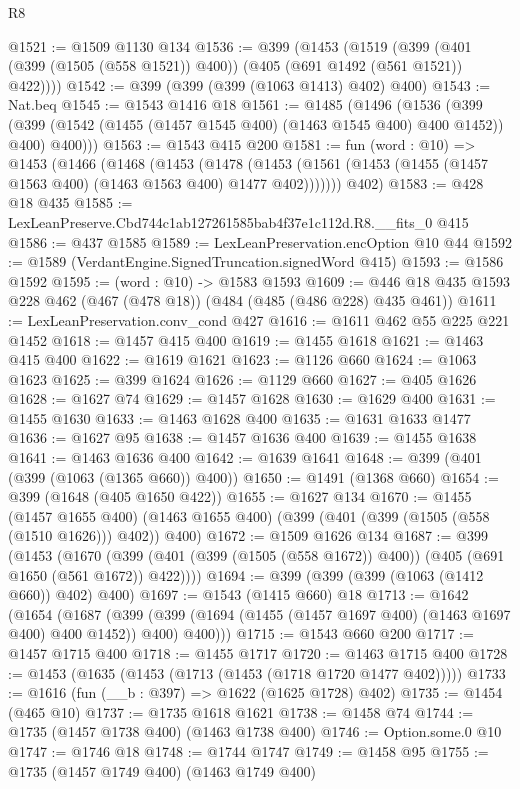 \begin{lexlean}{R8}
\begin{coremodule}
@1521 := @1509 @1130 @134
@1536 := @399
    (@1453
      (@1519 (@399 (@401 (@399 (@1505 (@558 @1521)) @400)) (@405 (@691 @1492 (@561 @1521)) @422))))
@1542 := @399 (@399 (@399 (@1063 @1413) @402) @400)
@1543 := Nat.beq
@1545 := @1543 @1416 @18
@1561 := @1485
    (@1496
      (@1536
        (@399 (@399 (@1542 (@1455 (@1457 @1545 @400) (@1463 @1545 @400) @400 @1452)) @400) @400)))
@1563 := @1543 @415 @200
@1581 := fun (word : @10) =>
  @1453
    (@1466
      (@1468
        (@1453
          (@1478 (@1453 (@1561 (@1453 (@1455 (@1457 @1563 @400) (@1463 @1563 @400) @1477 @402)))))))
      @402)
@1583 := @428 @18 @435
@1585 := LexLeanPreserve.Cbd744c1ab127261585bab4f37e1c112d.R8.__fits_0 @415
@1586 := @437 @1585
@1589 := LexLeanPreservation.encOption @10 @44
@1592 := @1589 (VerdantEngine.SignedTruncation.signedWord @415)
@1593 := @1586 @1592
@1595 := (word : @10) -> @1583 @1593
@1609 := @446 @18 @435 @1593 @228 @462 (@467 (@478 @18)) (@484 (@485 (@486 @228) @435 @461))
@1611 := LexLeanPreservation.conv_cond @427
@1616 := @1611 @462 @55 @225 @221 @1452
@1618 := @1457 @415 @400
@1619 := @1455 @1618
@1621 := @1463 @415 @400
@1622 := @1619 @1621
@1623 := @1126 @660
@1624 := @1063 @1623
@1625 := @399 @1624
@1626 := @1129 @660
@1627 := @405 @1626
@1628 := @1627 @74
@1629 := @1457 @1628
@1630 := @1629 @400
@1631 := @1455 @1630
@1633 := @1463 @1628 @400
@1635 := @1631 @1633 @1477
@1636 := @1627 @95
@1638 := @1457 @1636 @400
@1639 := @1455 @1638
@1641 := @1463 @1636 @400
@1642 := @1639 @1641
@1648 := @399 (@401 (@399 (@1063 (@1365 @660)) @400))
@1650 := @1491 (@1368 @660)
@1654 := @399 (@1648 (@405 @1650 @422))
@1655 := @1627 @134
@1670 := @1455
    (@1457 @1655 @400)
    (@1463 @1655 @400)
    (@399 (@401 (@399 (@1505 (@558 (@1510 @1626))) @402)) @400)
@1672 := @1509 @1626 @134
@1687 := @399
    (@1453
      (@1670 (@399 (@401 (@399 (@1505 (@558 @1672)) @400)) (@405 (@691 @1650 (@561 @1672)) @422))))
@1694 := @399 (@399 (@399 (@1063 (@1412 @660)) @402) @400)
@1697 := @1543 (@1415 @660) @18
@1713 := @1642
    (@1654
      (@1687
        (@399 (@399 (@1694 (@1455 (@1457 @1697 @400) (@1463 @1697 @400) @400 @1452)) @400) @400)))
@1715 := @1543 @660 @200
@1717 := @1457 @1715 @400
@1718 := @1455 @1717
@1720 := @1463 @1715 @400
@1728 := @1453 (@1635 (@1453 (@1713 (@1453 (@1718 @1720 @1477 @402)))))
@1733 := @1616 (fun (__b : @397) => @1622 (@1625 @1728) @402)
@1735 := @1454 (@465 @10)
@1737 := @1735 @1618 @1621
@1738 := @1458 @74
@1744 := @1735 (@1457 @1738 @400) (@1463 @1738 @400)
@1746 := Option.some.{0} @10
@1747 := @1746 @18
@1748 := @1744 @1747
@1749 := @1458 @95
@1755 := @1735 (@1457 @1749 @400) (@1463 @1749 @400)

\end{coremodule}
\end{lexlean}

